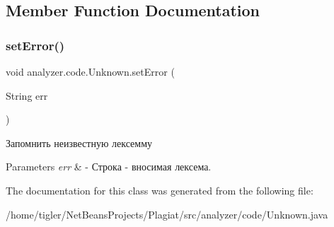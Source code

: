 \subsection{Member Function Documentation}
\mbox{\label{classanalyzer_1_1code_1_1Unknown_a7229e15dc0bba3a32526b47cf55e5e1e}} 
\subsubsection{\texorpdfstring{set\+Error()}{setError()}}
{\footnotesize\ttfamily void analyzer.\+code.\+Unknown.\+set\+Error (\begin{DoxyParamCaption}\item[{String}]{err }\end{DoxyParamCaption})\hspace{0.3cm}{\ttfamily [inline]}}

Запомнить неизвестную лексемму 
\begin{DoxyParams}{Parameters}
{\em err} & -\/ Строка -\/ вносимая лексема. \\
\hline
\end{DoxyParams}


The documentation for this class was generated from the following file\+:\begin{DoxyCompactItemize}
\item 
/home/tigler/\+Net\+Beans\+Projects/\+Plagiat/src/analyzer/code/Unknown.\+java\end{DoxyCompactItemize}
